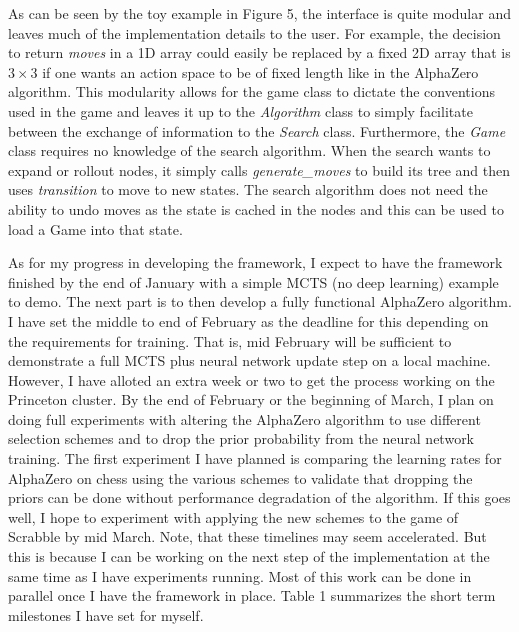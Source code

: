 \documentclass{article}
\begin{document}
  As can be seen by the toy example in Figure 5, the interface is quite modular and leaves much of the implementation details to the user. For example, the decision to return \textit{moves} in a 1D array could easily be replaced by a fixed 2D array that is $3 \times 3$ if one wants an action space to be of fixed length like in the AlphaZero algorithm. This modularity allows for the game class to dictate the conventions used in the game and leaves it up to the \textit{Algorithm} class to simply facilitate between the exchange of information to the \textit{Search} class. Furthermore, the \textit{Game} class requires no knowledge of the search algorithm. When the search wants to expand or rollout nodes, it simply calls \textit{generate\_moves} to build its tree and then uses \textit{transition} to move to new states. The search algorithm does not need the ability to undo moves as the state is cached in the nodes and this can be used to load a Game into that state.

  As for my progress in developing the framework, I expect to have the framework finished by the end of January with a simple MCTS (no deep learning) example to demo. The next part is to then develop a fully functional AlphaZero algorithm. I have set the middle to end of February as the deadline for this depending on the requirements for training. That is, mid February will be sufficient to demonstrate a full MCTS plus neural network update step on a local machine. However, I have alloted an extra week or two to get the process working on the Princeton cluster. By the end of February or the beginning of March, I plan on doing full experiments with altering the AlphaZero algorithm to use different selection schemes and to drop the prior probability from the neural network training. The first experiment I have planned is comparing the learning rates for AlphaZero on chess using the various schemes to validate that dropping the priors can be done without performance degradation of the algorithm. If this goes well, I hope to experiment with applying the new schemes to the game of Scrabble by mid March. Note, that these timelines may seem accelerated. But this is because I can be working on the next step of the implementation at the same time as I have experiments running. Most of this work can be done in parallel once I have the framework in place. Table 1 summarizes the short term milestones I have set for myself.
\end{document}
